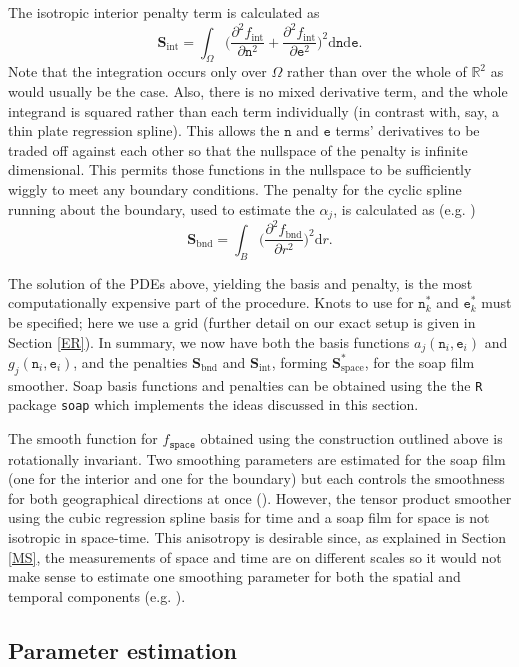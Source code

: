The isotropic interior penalty term is calculated as
$$
\textbf{S}_\text{int} = \int_\Omega \Big(\frac{\partial^2 f_\text{int}}{\partial \texttt{n}^2}+\frac{\partial^2 f_\text{int}}{\partial \texttt{e}^2} 
\Big)^2\text{d}\texttt{n}\text{d}\texttt{e}.
$$
Note that the integration occurs only over $\Omega$ rather than over the whole of $\mathbb{R}^2$ as would usually be the case. Also, there is no mixed derivative term, and the whole integrand is squared rather than each term individually (in contrast with, say, a thin plate regression spline). This allows the $\texttt{n}$ and $\texttt{e}$ terms' derivatives to be traded off against each other so that the nullspace of the penalty is infinite dimensional. This permits those functions in the nullspace to be sufficiently wiggly to meet any boundary conditions. The penalty for the cyclic spline running about the boundary, used to estimate the $\alpha_j$, is calculated as (e.g. \cite{simonbook})
$$
\textbf{S}_\text{bnd} = \int_B \Big(\frac{\partial^2 f_\text{bnd}}{\partial r^2}\Big)^2 \text{d}r.
$$

The solution of the PDEs above, yielding the basis and penalty, is the most computationally expensive part of the procedure. Knots to use for $\texttt{n}_k^*$ and $\texttt{e}_k^*$ must be specified; here we use a grid (further detail on our exact setup is given in Section \ref{ER}). In summary, we now have both the basis functions $a_j(\texttt{n}_i,\texttt{e}_i)$ and $g_j(\texttt{n}_i,\texttt{e}_i)$, and the penalties $\textbf{S}_\text{bnd}$ and $\textbf{S}_\text{int}$, forming $\textbf{S}^*_\text{space}$, for the soap film smoother. Soap basis functions and penalties can be obtained using the the \texttt{R} package \texttt{soap} which implements the ideas discussed in this section.

The smooth function for $f_\texttt{space}$ obtained using the construction outlined above is rotationally invariant. Two smoothing parameters are estimated for the soap film (one for the interior and one for the boundary) but each controls the smoothness for both geographical directions at once (\cite{soap}). However, the tensor product smoother using the cubic regression spline basis for time and a soap film for space is not isotropic in space-time. This anisotropy is desirable since, as explained in Section \ref{MS}, the measurements of space and time are on different scales so it would not make sense to estimate one smoothing parameter for both the spatial and temporal components (e.g. \cite[p. 162]{simonbook}).


\subsection{Parameter estimation \label{PE}}

